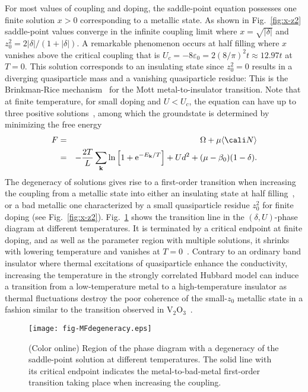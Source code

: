 \documentclass[showpacs,amsmath,twocolumn,floatfix]{revtex4-1}
\begin{document}
For most values of coupling and doping, the saddle-point equation 
possesses one finite solution $x>0$ corresponding to a metallic state. 
As shown in Fig.~\ref{fig:x-z2} saddle-point values converge in the 
infinite coupling limit where $x=\sqrt{|\delta|}$ and 
$z_0^2 = 2|\delta|/(1+|\delta|)$. A remarkable phenomenon occurs at 
half filling where $x$ vanishes above the critical coupling that is 
$U_c = - 8 \varepsilon_0=2(8/\pi)^2 t \approx 12.97 t$ at $T=0$. This 
solution corresponds to an insulating state since $z_0^2=0$ results 
in a diverging quasiparticle mass and a vanishing quasiparticle 
residue: This is the Brinkman-Rice mechanism~\cite{Bri70} for the 
Mott metal-to-insulator transition. Note that at finite temperature, 
for small doping and $U<U_c$, the equation can have up to three 
positive solutions~\cite{Doll3}, among which the groundstate is 
determined by minimizing the free energy
\begin{eqnarray}
 F & = & \Omega + \mu  \langle {\cali N} \rangle \\
 & = & - \frac{2 T}{L} \sum_{{\bf k}} \ln \left[1 + \mathrm{e}^{-E_{{\bf k}}/T}\right] 
 + U d^2 + (\mu - \beta_0) (1-\delta). \nonumber
\end{eqnarray}
The degeneracy of solutions gives rise to a first-order transition 
when increasing the coupling from a metallic state into either an 
insulating state at half filling~\cite{FK97}, or a bad metallic one 
characterized by a small quasiparticle residue $z_0^2$ for finite 
doping (see Fig.~\ref{fig:x-z2}). Fig.~\ref{fig:MFdegeneracy} shows 
the transition line in the $(\delta,U)$-phase diagram at different 
temperatures. It is terminated by a critical endpoint at finite doping, 
and as well as the parameter region with multiple solutions, it shrinks 
with lowering temperature and vanishes at $T=0$~\cite{Doll3,camjayi07}. 
Contrary to an ordinary band insulator where thermal excitations of 
quasiparticle enhance the conductivity, increasing the temperature in 
the strongly correlated Hubbard model can induce a transition from a 
low-temperature metal to a high-temperature insulator as thermal 
fluctuations destroy the poor coherence of the small-$z_0$ metallic 
state in a fashion similar to the transition observed in 
V$_2$O$_3$~\cite{McWhan73}. 

\begin{figure}[h]
	 \texttt{[image: fig-MFdegeneracy.eps]}
	\caption{(Color online) Region of the phase diagram with a degeneracy 
	of the saddle-point solution at different temperatures. The solid line 
	with its critical endpoint indicates the metal-to-bad-metal 
	first-order transition taking place when increasing the coupling.}
	\label{fig:MFdegeneracy}
\end{figure}
\end{document}
